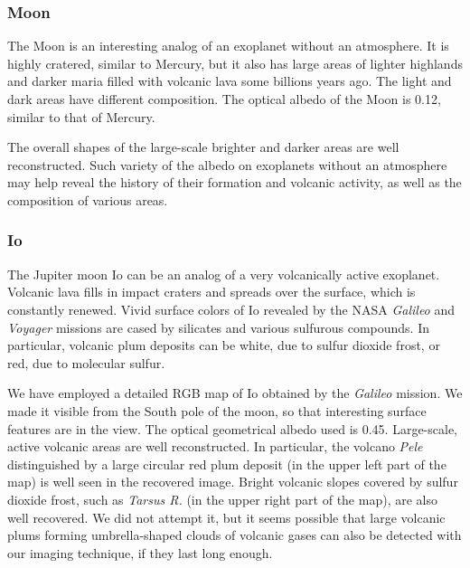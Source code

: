 \documentclass{emulateapj}
\begin{document}
\subsubsection{Moon}\label{sec:inve_solsys_surf_moon}

The Moon is an interesting analog of an exoplanet without an atmosphere.
It is highly cratered, similar to Mercury, but it also has large areas of
lighter highlands and darker maria filled with volcanic lava some billions years ago. 
The light and dark areas have different composition. The optical albedo
of the Moon is 0.12, similar to that of Mercury.

The overall shapes of the large-scale brighter and darker areas are well reconstructed.
Such variety of the albedo on exoplanets without an atmosphere may help
reveal the history of their formation and volcanic activity, as well as the composition
of various areas.

\subsubsection{Io}\label{sec:inve_solsys_surf_io}

The Jupiter moon Io can be an analog of a very volcanically active exoplanet. 
Volcanic lava fills in impact craters and spreads over
the surface, which is constantly renewed. Vivid surface colors of Io
revealed by the NASA {\em Galileo} and {\em Voyager} missions are cased by silicates and 
various sulfurous compounds. In particular, volcanic plum deposits can be white,
due to sulfur dioxide frost, or red, due to molecular sulfur. 

We have employed a detailed RGB map of Io obtained by the {\em Galileo} mission.
We made it visible from the South pole of the moon, so that interesting 
surface features are in the view. The optical geometrical albedo used is 0.45.
Large-scale, active volcanic areas are well reconstructed. In particular, 
the volcano {\em Pele} distinguished by a large circular red plum deposit 
(in the upper left part of the map) is well seen in the recovered image. 
Bright volcanic slopes covered by sulfur dioxide frost, 
such as {\em Tarsus R.} (in the upper right part of the map), are also well recovered.
We did not attempt it, but it seems possible that large volcanic plums 
forming umbrella-shaped clouds of volcanic gases can also be detected 
with our imaging technique, if they last long enough.
\end{document}
